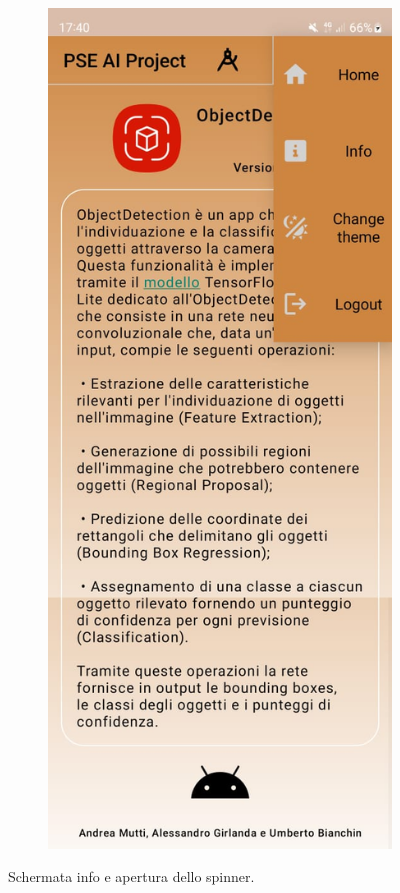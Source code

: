 \begin{figure}[H]
\begin{subfigure}[b]{0.3\textwidth}
  \end{subfigure}
  \begin{subfigure}[b]{0.3\textwidth}
    \includegraphics[width=\textwidth, height=0.45\textheight]{Immagini/App/info_spinner_chiaro.jpeg}
  \end{subfigure}
  \caption{Schermata info e apertura dello spinner.}
  \label{fig:info}
\end{figure}

